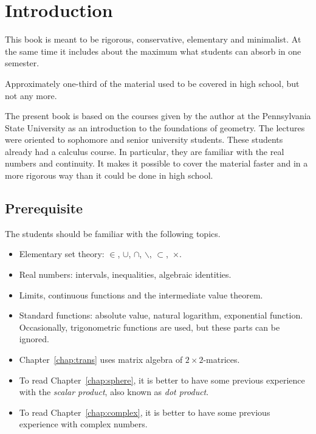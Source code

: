 \chapter*{Introduction}

This book is meant to be 
rigorous, 
conservative, 
elementary and
minimalist.
At the same time it includes about the maximum what students can absorb in one semester.

Approximately one-third of the material used to be covered in high school, but not any more.

The present book is based 
on the courses given by the author 
at the Pennsylvania State University
as an introduction to the foundations of geometry.
The lectures were oriented to sophomore and senior university students.  
These students already had a calculus course.
In particular, they are familiar with the real numbers and continuity.
It makes it possible to cover the material faster 
and  in a more rigorous way
than it could be done in high school.

\section*{Prerequisite}

The students should be familiar 
with the following topics.
\begin{itemize}
\item Elementary set theory: 
$\in$,
$\cup$, 
$\cap$,
$\backslash$,
$\subset$,~$\times$.
\item Real numbers: intervals, inequalities, algebraic identities.
\item Limits, continuous functions and the intermediate value theorem.
\item Standard functions: 
absolute value, 
natural logarithm,
exponential function. 
Occasionally, trigonometric functions  are used, 
but these parts can be ignored.
\item  Chapter~\ref{chap:trans} uses matrix algebra of $2{\times}2$-matrices.
\item To read Chapter~\ref{chap:sphere}, it is better to have some previous experience with the {}\emph{scalar product}, also known as {}\emph{dot product}.
\item To read Chapter~\ref{chap:complex}, it is better to have some previous experience with complex numbers.
\end{itemize} 

